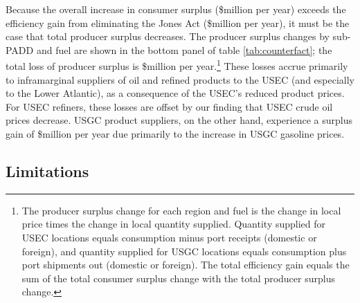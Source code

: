 \documentclass[12pt]{article}
\begin{document}
Because the overall increase in consumer surplus (\$million per year) exceeds the efficiency gain from eliminating the Jones Act (\$million per year), it must be the case that total producer surplus decreases. The producer surplus changes by sub-PADD and fuel are shown in the bottom panel of table \ref{tab:counterfact}; the total loss of producer surplus is \$million per year.\footnote{The producer surplus change for each region and fuel is the change in local price times the change in local quantity supplied. Quantity supplied for USEC locations equals consumption minus port receipts (domestic or foreign), and quantity supplied for USGC locations equals consumption plus port shipments out (domestic or foreign). The total efficiency gain equals the sum of the total consumer surplus change with the total producer surplus change.} These losses accrue primarily to inframarginal suppliers of oil and refined products to the USEC (and especially to the Lower Atlantic), as a consequence of the USEC's reduced product prices. For USEC refiners, these losses are offset by our finding that USEC crude oil prices decrease. USGC product suppliers, on the other hand, experience a surplus gain of \$million per year due primarily to the increase in USGC gasoline prices.


\subsection{Limitations} \label{sec:Limits}
\end{document}
